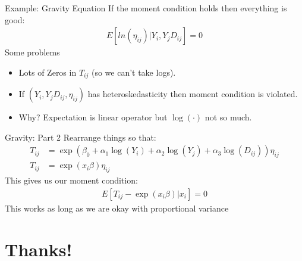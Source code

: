 \documentclass[aspectratio=169]{beamer}
\begin{document}
\begin{frame}{Example: Gravity Equation}
If the moment condition holds then everything is good:
\begin{align*}
E[ln (\eta_{ij}) | Y_i, Y_j D_{ij} ]=0
\end{align*}
Some problems
\begin{itemize}
\item Lots of Zeros in $T_{ij}$ (so we can't take logs).
\item If $( Y_i, Y_j D_{ij},\eta_{ij})$ has heteroskedasticity then moment condition is violated.
\item Why?  Expectation is \alert{linear operator} but $\log(\cdot)$ not so much.
\end{itemize}
\end{frame}

\begin{frame}{Gravity: Part 2}
Rearrange things so that:
\begin{align*}
T_{i j}&=\exp \left(\beta_{0}+\alpha_{1} \log \left(Y_{i}\right)+\alpha_{2} \log \left(Y_{j}\right)+\alpha_{3} \log \left(D_{i j}\right)\right) \eta_{i j} \\
T_{i j}&=\exp \left(x_{i} \beta\right) \eta_{i j}
\end{align*}
This gives us our moment condition:
\begin{align*}
E[ T_{i j} - \exp \left(x_{i} \beta\right) | x_i]=0
\end{align*}
This works as long as we are okay with \alert{proportional variance}

\end{frame}



\section*{Thanks!}
\end{document}
